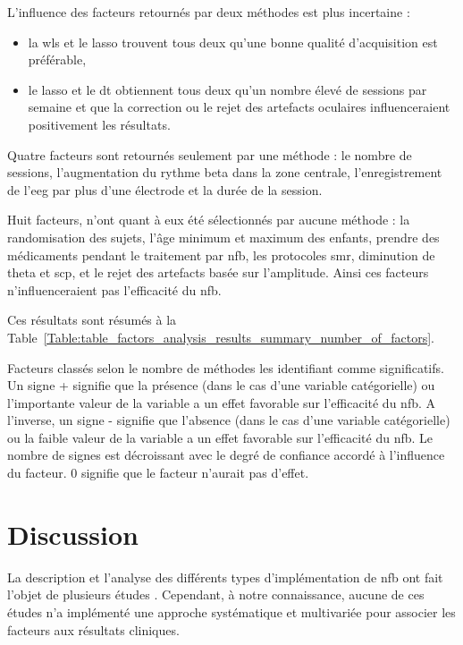 L'influence des facteurs retournés par deux méthodes est plus incertaine :
\begin{itemize}
	\item la \gls{wls} et le \gls{lasso} trouvent tous deux qu'une bonne qualité d'acquisition est préférable,
  \item le \gls{lasso} et le \gls{dt} obtiennent tous deux qu'un nombre élevé de sessions par semaine et que la correction ou le rejet des artefacts oculaires
	influenceraient positivement les résultats. 
\end{itemize}

Quatre facteurs sont retournés seulement par une méthode : le nombre de sessions, l'augmentation du rythme beta dans la zone centrale, l'enregistrement
de l'\gls{eeg} par plus d'une électrode et la durée de la session. 

Huit facteurs, n'ont quant à eux été sélectionnés par aucune méthode : la randomisation des sujets, l'âge minimum et maximum des enfants, prendre des 
médicaments pendant le traitement par \gls{nfb}, les protocoles \gls{smr}, diminution de theta et \gls{scp}, et le rejet
des artefacts basée sur l'amplitude. Ainsi ces facteurs n'influenceraient pas l'efficacité du \gls{nfb}. 

Ces résultats sont résumés à la Table~\ref{Table:table_factors_analysis_results_summary_number_of_factors}.

\begin{table}[h!]
  \centering
  \caption{Facteurs classés selon le nombre de méthodes les identifiant comme significatifs. Un signe + signifie que la présence (dans le cas d'une variable catégorielle) ou l'importante valeur
	de la variable a un effet favorable sur l'efficacité du \gls{nfb}. A l'inverse, un signe - signifie que l'absence (dans le cas d'une variable catégorielle) ou la faible valeur
	de la variable a un effet favorable sur l'efficacité du \gls{nfb}. Le nombre de signes est décroissant avec le degré de confiance accordé à l'influence du facteur. 0 signifie 
	que le facteur n'aurait pas d'effet.}
  
  \label{Table:table_factors_analysis_results_summary_number_of_factors}
\end{table}

\section{Discussion}

La description et l'analyse des différents types d'implémentation de \gls{nfb} ont fait l'objet de plusieurs études \citep{Arns2014, 
Jeunet2018, Arns2009, Cortese2016, Alkoby2017, Rogala2016, Enriquez2017}. Cependant, à notre connaissance, aucune de ces études n'a implémenté une approche systématique et 
multivariée pour associer les facteurs aux résultats cliniques. 

